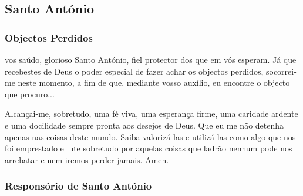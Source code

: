 \subsection{Santo António}

\subsubsection{Objectos Perdidos}
 vos saúdo, glorioso Santo António, fiel protector dos que em vós esperam. Já que recebestes de Deus o poder especial de fazer achar os objectos perdidos, socorrei-me neste momento, a fim de que, mediante vosso auxílio, eu encontre o objecto que procuro...\par
Alcançai-me, sobretudo, uma fé viva, uma esperança firme, uma caridade ardente e uma docilidade sempre pronta aos desejos de Deus. Que eu me não detenha apenas nas coisas deste mundo. Saiba valorizá-las e utilizá-las como algo que nos foi emprestado e lute sobretudo por aquelas coisas que ladrão nenhum pode nos arrebatar e nem iremos perder jamais. Amen.

\subsubsection{Responsório de Santo António}\label{respstantonio}

